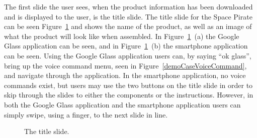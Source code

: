 The first slide the user sees, when the product information has been downloaded and is displayed to the user, is the title slide. The title slide for the Space Pirate can be seen Figure~\ref{demoCase1} and shows the name of the product, as well as an image of what the product will look like when assembled. In Figure~\ref{demoCase1}~(a) the Google Glass application can be seen, and in Figure~\ref{demoCase1}~(b) the smartphone application can be seen. Using the Google Glass application users can, by saying ``ok glass'', bring up the voice command menu, seen in Figure~\ref{demoCaseVoiceCommand}, and navigate through the application. In the smartphone application, no voice commands exist, but users may use the two buttons on the title slide in order to skip through the slides to either the components or the instructions. However, in both the Google Glass application and the smartphone application users can simply swipe, using a finger, to the next slide in line. 

	\begin{figure}[ht!]
		\centering
		\qquad
		\caption{The title slide.}
		\label{demoCase1}
	\end{figure}	

